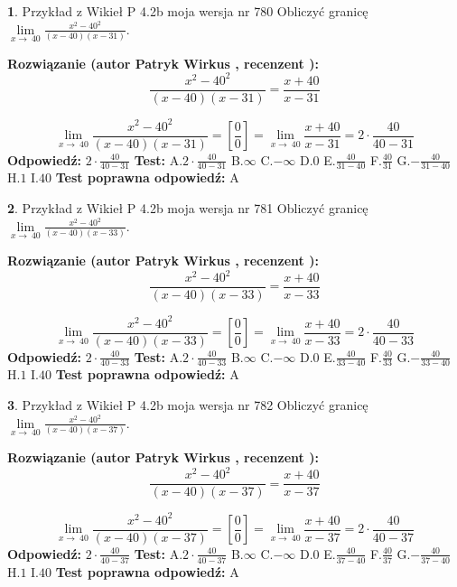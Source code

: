 \documentclass[12pt, a4paper]{article}
\theoremstyle{definition} %
\newtheorem{zad}{}
\newcommand{\zadStart}[1]{\begin{zad}#1\newline}
\newcommand{\zadStop}{\end{zad}}
\newcommand{\rozwStart}[2]{\noindent \textbf{Rozwiązanie (autor #1 , recenzent #2): }\newline}
\newcommand{\rozwStop}{\newline}
\newcommand{\odpStart}{\noindent \textbf{Odpowiedź:}\newline}
\newcommand{\odpStop}{\newline}
\newcommand{\testStart}{\noindent \textbf{Test:}\newline}
\newcommand{\testStop}{\newline}
\newcommand{\kluczStart}{\noindent \textbf{Test poprawna odpowiedź:}\newline}
\newcommand{\kluczStop}{\newline}
\begin{document}
\zadStart{Przykład z Wikieł P 4.2b moja wersja nr 780}
Obliczyć granicę $\lim\limits_{x\to\ 40}\frac{x^{2}-40^{2}}{(x-40)(x-31)}$.
\zadStop
\rozwStart{Patryk Wirkus}{}
$$\frac{x^{2}-40^{2}}{(x-40)(x-31)}=\frac{x+40}{x-31}$$

$$\lim\limits_{x\to\ 40}\frac{x^{2}-40^{2}}{(x-40)(x-31)}=[\frac{0}{0}]=\lim\limits_{x\to\ 40}\frac{x+40}{x-31}=2 \cdot \frac{40}{40-31}$$
\rozwStop
\odpStart
$2 \cdot \frac{40}{40-31}$
\odpStop
\testStart
A.$2 \cdot \frac{40}{40-31}$
B.$\infty$
C.$-\infty$
D.$0$
E.$\frac{40}{31-40}$
F.$\frac{40}{31}$
G.$-\frac{40}{31-40}$
H.$1$
I.$40$
\testStop
\kluczStart
A
\kluczStop



\zadStart{Przykład z Wikieł P 4.2b moja wersja nr 781}
Obliczyć granicę $\lim\limits_{x\to\ 40}\frac{x^{2}-40^{2}}{(x-40)(x-33)}$.
\zadStop
\rozwStart{Patryk Wirkus}{}
$$\frac{x^{2}-40^{2}}{(x-40)(x-33)}=\frac{x+40}{x-33}$$

$$\lim\limits_{x\to\ 40}\frac{x^{2}-40^{2}}{(x-40)(x-33)}=[\frac{0}{0}]=\lim\limits_{x\to\ 40}\frac{x+40}{x-33}=2 \cdot \frac{40}{40-33}$$
\rozwStop
\odpStart
$2 \cdot \frac{40}{40-33}$
\odpStop
\testStart
A.$2 \cdot \frac{40}{40-33}$
B.$\infty$
C.$-\infty$
D.$0$
E.$\frac{40}{33-40}$
F.$\frac{40}{33}$
G.$-\frac{40}{33-40}$
H.$1$
I.$40$
\testStop
\kluczStart
A
\kluczStop



\zadStart{Przykład z Wikieł P 4.2b moja wersja nr 782}
Obliczyć granicę $\lim\limits_{x\to\ 40}\frac{x^{2}-40^{2}}{(x-40)(x-37)}$.
\zadStop
\rozwStart{Patryk Wirkus}{}
$$\frac{x^{2}-40^{2}}{(x-40)(x-37)}=\frac{x+40}{x-37}$$

$$\lim\limits_{x\to\ 40}\frac{x^{2}-40^{2}}{(x-40)(x-37)}=[\frac{0}{0}]=\lim\limits_{x\to\ 40}\frac{x+40}{x-37}=2 \cdot \frac{40}{40-37}$$
\rozwStop
\odpStart
$2 \cdot \frac{40}{40-37}$
\odpStop
\testStart
A.$2 \cdot \frac{40}{40-37}$
B.$\infty$
C.$-\infty$
D.$0$
E.$\frac{40}{37-40}$
F.$\frac{40}{37}$
G.$-\frac{40}{37-40}$
H.$1$
I.$40$
\testStop
\kluczStart
A
\kluczStop
\end{document}
